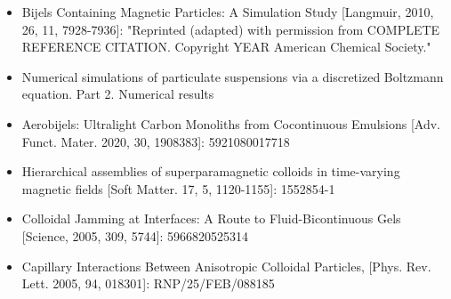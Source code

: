 \begin{itemize}
    {COMPLETE REFERENCE CITATION}. Copyright {YEAR} American Chemical Society."
    \item Bijels Containing Magnetic Particles: A Simulation Study [Langmuir, 2010, 26, 11, 7928-7936]: 
    "Reprinted (adapted) with permission from {COMPLETE REFERENCE CITATION}. Copyright {YEAR} 
    American Chemical Society."
    \item Numerical simulations of particulate suspensions via a discretized Boltzmann equation. Part 2. Numerical results
    \item Aerobijels: Ultralight Carbon Monoliths from Cocontinuous Emulsions 
    [Adv. Funct. Mater. 2020, 30, 1908383]: 5921080017718
    \item Hierarchical assemblies of superparamagnetic colloids in 
    time-varying magnetic fields [Soft Matter. 17, 5, 1120-1155]: 1552854-1
    \item Colloidal Jamming at Interfaces: A Route to Fluid-Bicontinuous Gels [Science, 2005, 309, 5744]: 5966820525314
    \item Capillary Interactions Between Anisotropic Colloidal Particles, [Phys. Rev. Lett. 2005, 94, 018301]: RNP/25/FEB/088185
\end{itemize}